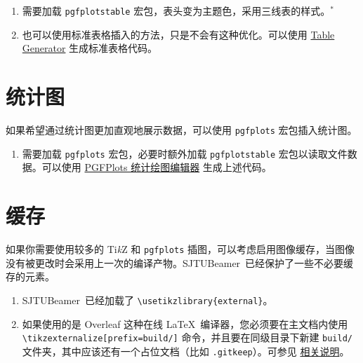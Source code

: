 \documentclass[
    UTF8,
    heading=true,
    12pt,
    a4paper
]{ctexrep}
\newenvironment{commentlist}{\begin{enumerate}\small}{\end{enumerate}}
\def\themename{\textsf{SJTUBeamer}}
\begin{document}

\begin{commentlist}
  \item 需要加载 \texttt{pgfplotstable} 宏包，表头变为主题色，采用三线表的样式。$^*$
  \item 也可以使用标准表格插入的方法，只是不会有这种优化。可以使用 \href{https://www.tablesgenerator.com/latex_tables}{Table Generator} 生成标准表格代码。
\end{commentlist}

\section{统计图}

如果希望通过统计图更加直观地展示数据，可以使用 \texttt{pgfplots} 宏包插入统计图。


\begin{commentlist}
  \item 需要加载 \texttt{pgfplots} 宏包，必要时额外加载 \texttt{pgfplotstable} 宏包以读取文件数据。可以使用 \href{https://logcreative.github.io/PGFPlotsEdt/}{PGFPlots 统计绘图编辑器} 生成上述代码。
\end{commentlist}

\section{缓存}

如果你需要使用较多的 Ti\emph{k}Z 和 \texttt{pgfplots} 插图，可以考虑启用图像缓存，当图像没有被更改时会采用上一次的编译产物。\themename\ 已经保护了一些不必要缓存的元素。


\begin{commentlist}
  \item \themename\ 已经加载了 \verb"\usetikzlibrary{external}"。
  \item[\faExclamationTriangle] 如果使用的是 Overleaf 这种在线 \LaTeX\ 编译器，您必须要在主文档内使用 \verb"\tikzexternalize[prefix=build/]" 命令，并且要在同级目录下新建 \verb"build/" 文件夹，其中应该还有一个占位文档（比如 \verb".gitkeep"）。可参见 \href{https://www.overleaf.com/learn/latex/Questions/I_have_a_lot_of_tikz%2C_matlab2tikz_or_pgfplots_figures%2C_so_I%27m_getting_a_compilation_timeout._Can_I_externalise_my_figures%3F}{相关说明}。
\end{commentlist}

\end{document}
